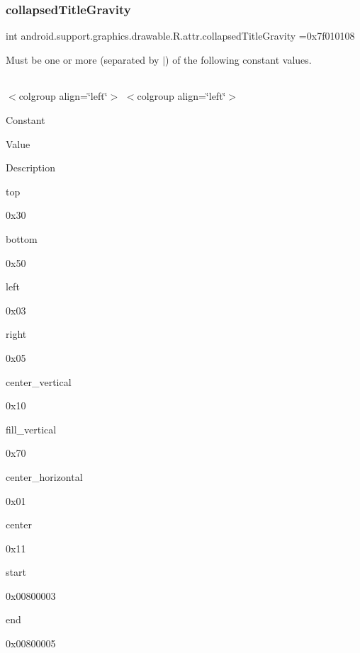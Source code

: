 \subsubsection{\texorpdfstring{collapsed\+Title\+Gravity}{collapsedTitleGravity}}
{\footnotesize\ttfamily int android.\+support.\+graphics.\+drawable.\+R.\+attr.\+collapsed\+Title\+Gravity =0x7f010108\hspace{0.3cm}{\ttfamily [static]}}

Must be one or more (separated by \textquotesingle{}$\vert$\textquotesingle{}) of the following constant values.

\tabulinesep=1mm
\begin{longtabu} spread 0pt [c]{*{0}{|X[-1]}|}
\hline
\end{longtabu}
$<$colgroup align=\char`\"{}left\char`\"{}$>$ $<$colgroup align=\char`\"{}left\char`\"{}$>$ 

Constant

Value

Description 

{\ttfamily top}

0x30

{\ttfamily bottom}

0x50

{\ttfamily left}

0x03

{\ttfamily right}

0x05

{\ttfamily center\+\_\+vertical}

0x10

{\ttfamily fill\+\_\+vertical}

0x70

{\ttfamily center\+\_\+horizontal}

0x01

{\ttfamily center}

0x11

{\ttfamily start}

0x00800003

{\ttfamily end}

0x00800005\mbox{\label{classandroid_1_1support_1_1graphics_1_1drawable_1_1R_1_1attr_ae1f4e97e2d969f48c46f5508b8660493}} 
